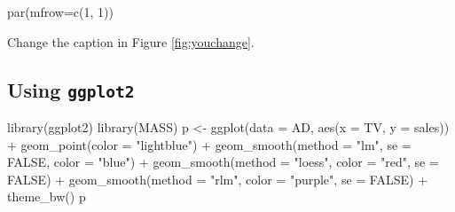 \documentclass[
]{article}
\newenvironment{Shaded}{\begin{snugshade}}{\end{snugshade}}
\newcommand{\AttributeTok}[1]{\textcolor[rgb]{0.77,0.63,0.00}{#1}}
\newcommand{\ConstantTok}[1]{\textcolor[rgb]{0.00,0.00,0.00}{#1}}
\newcommand{\DecValTok}[1]{\textcolor[rgb]{0.00,0.00,0.81}{#1}}
\newcommand{\FunctionTok}[1]{\textcolor[rgb]{0.00,0.00,0.00}{#1}}
\newcommand{\NormalTok}[1]{#1}
\newcommand{\OtherTok}[1]{\textcolor[rgb]{0.56,0.35,0.01}{#1}}
\newcommand{\SpecialCharTok}[1]{\textcolor[rgb]{0.00,0.00,0.00}{#1}}
\newcommand{\StringTok}[1]{\textcolor[rgb]{0.31,0.60,0.02}{#1}}
\begin{document}
\begin{Shaded}
\begin{Highlighting}[]
\FunctionTok{par}\NormalTok{(}\AttributeTok{mfrow=}\FunctionTok{c}\NormalTok{(}\DecValTok{1}\NormalTok{, }\DecValTok{1}\NormalTok{))}
\end{Highlighting}
\end{Shaded}

Change the caption in Figure \ref{fig:youchange}.

\hypertarget{using-ggplot2}{%
\subsection{\texorpdfstring{Using \texttt{ggplot2}}{Using ggplot2}}\label{using-ggplot2}}

\begin{Shaded}
\begin{Highlighting}[]
\FunctionTok{library}\NormalTok{(ggplot2)}
\FunctionTok{library}\NormalTok{(MASS)}
\NormalTok{p }\OtherTok{\textless{}{-}} \FunctionTok{ggplot}\NormalTok{(}\AttributeTok{data =}\NormalTok{ AD, }\FunctionTok{aes}\NormalTok{(}\AttributeTok{x =}\NormalTok{ TV, }\AttributeTok{y =}\NormalTok{ sales)) }\SpecialCharTok{+}
  \FunctionTok{geom\_point}\NormalTok{(}\AttributeTok{color =} \StringTok{"lightblue"}\NormalTok{) }\SpecialCharTok{+}
  \FunctionTok{geom\_smooth}\NormalTok{(}\AttributeTok{method =} \StringTok{"lm"}\NormalTok{, }\AttributeTok{se =} \ConstantTok{FALSE}\NormalTok{, }\AttributeTok{color =} \StringTok{"blue"}\NormalTok{) }\SpecialCharTok{+}
  \FunctionTok{geom\_smooth}\NormalTok{(}\AttributeTok{method =} \StringTok{"loess"}\NormalTok{, }\AttributeTok{color =} \StringTok{"red"}\NormalTok{, }\AttributeTok{se =} \ConstantTok{FALSE}\NormalTok{) }\SpecialCharTok{+} 
  \FunctionTok{geom\_smooth}\NormalTok{(}\AttributeTok{method =} \StringTok{"rlm"}\NormalTok{, }\AttributeTok{color =} \StringTok{"purple"}\NormalTok{, }\AttributeTok{se =} \ConstantTok{FALSE}\NormalTok{) }\SpecialCharTok{+}
  \FunctionTok{theme\_bw}\NormalTok{()}
\NormalTok{p}
\end{Highlighting}
\end{Shaded}
\end{document}
